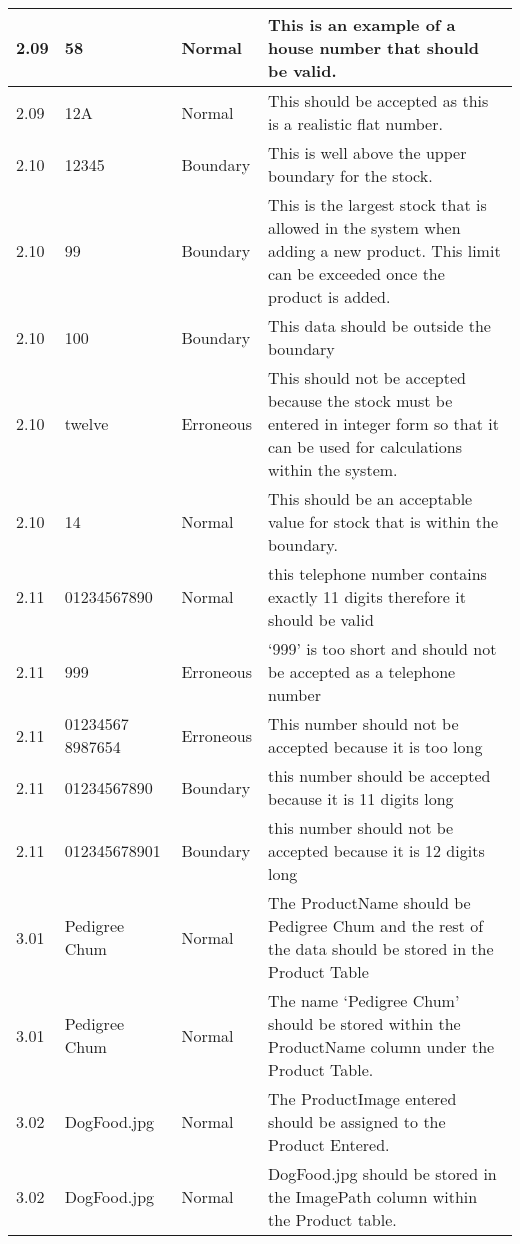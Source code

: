 \begin{flushleft}
\begin{longtable}{|p{1.5cm}|p{2.5cm}|p{2cm}|p{4.5cm}|}
	\rowcolor{light-grey}2.09 & 58  & Normal & This is an example of a house number that should be valid. \\ \hline
	\rowcolor{light-grey}2.09 & 12A  & Normal & This should be accepted as this is a realistic flat number. \\ \hline
	\rowcolor{light-grey}2.10 & 12345  & Boundary & This is well above the upper boundary for the stock. \\ \hline
	\rowcolor{light-grey}2.10 & 99  & Boundary & This is the largest stock that is allowed in the system when adding a new product. This limit can be exceeded once the product is added.\\ \hline
	\rowcolor{light-grey}2.10 & 100 & Boundary & This data should be outside the boundary \\ \hline
	\rowcolor{light-grey}2.10 & twelve  & Erroneous & This should not be accepted because the stock must be entered in integer form so that it can be used for calculations within the system.\\ \hline
	\rowcolor{light-grey}2.10 & 14  & Normal & This should be an acceptable value for stock that is within the boundary. \\ \hline
	2.11 &  01234567890 & Normal & this telephone number contains exactly 11 digits therefore it should be valid \\ \hline
	2.11 &  999& Erroneous &  `999' is too short and should not be accepted as a telephone number \\ \hline
	2.11 &  01234567 8987654 & Erroneous & This number should not be accepted because it is too long \\ \hline
	2.11 &  01234567890 & Boundary & this number should be accepted because it is 11 digits long \\ \hline
	2.11 & 012345678901 & Boundary & this number should not be accepted because it is 12 digits long \\ \hline
	\rowcolor{dark-grey}3.01 &  Pedigree Chum & Normal & The ProductName should be Pedigree Chum and the rest of the data should be stored in the Product Table \\ \hline
	\rowcolor{light-grey}3.01 &  Pedigree Chum & Normal & The name `Pedigree Chum' should be stored within the ProductName column under the Product Table. \\ \hline
	\rowcolor{dark-grey}3.02 &  DogFood.jpg & Normal  & The ProductImage entered should be assigned to the Product Entered. \\ \hline
	\rowcolor{light-grey}3.02 &  DogFood.jpg & Normal  & DogFood.jpg should be stored in the ImagePath column within the Product table. \\ \hline

\end{longtable}
\end{flushleft}
